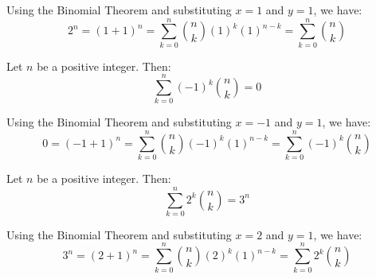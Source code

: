 \documentclass{huhtakm-template-book-v2}
\begin{document}
    \begin{proofing}
        Using the Binomial Theorem and substituting $x = 1$ and $y = 1$, we have:
        \begin{equation*}
            2^{n} = (1+1)^{n} = \sum_{k = 0}^{n}\binom{n}{k}(1)^{k}(1)^{n-k} = \sum_{k = 0}^{n}\binom{n}{k}
        \end{equation*}
    \end{proofing}
    \begin{cor}
        Let $n$ be a positive integer. Then:
        \begin{equation*}
            \sum_{k = 0}^{n}(-1)^{k}\binom{n}{k} = 0
        \end{equation*}
    \end{cor}
    \begin{proofing}
        Using the Binomial Theorem and substituting $x = -1$ and $y = 1$, we have:
        \begin{equation*}
            0 = (-1+1)^{n} = \sum_{k = 0}^{n}\binom{n}{k}(-1)^{k}(1)^{n-k} = \sum_{k = 0}^{n}(-1)^{k}\binom{n}{k}
        \end{equation*}
    \end{proofing}
    \begin{cor}
        Let $n$ be a positive integer. Then:
        \begin{equation*}
            \sum_{k = 0}^{n}2^{k}\binom{n}{k} = 3^{n}
        \end{equation*}
    \end{cor}
    \begin{proofing}
        Using the Binomial Theorem and substituting $x = 2$ and $y = 1$, we have:
        \begin{equation*}
            3^{n} = (2+1)^{n} = \sum_{k = 0}^{n}\binom{n}{k}(2)^{k}(1)^{n-k} = \sum_{k = 0}^{n}2^{k}\binom{n}{k}
        \end{equation*}
    \end{proofing}
    \newpage
\end{document}
